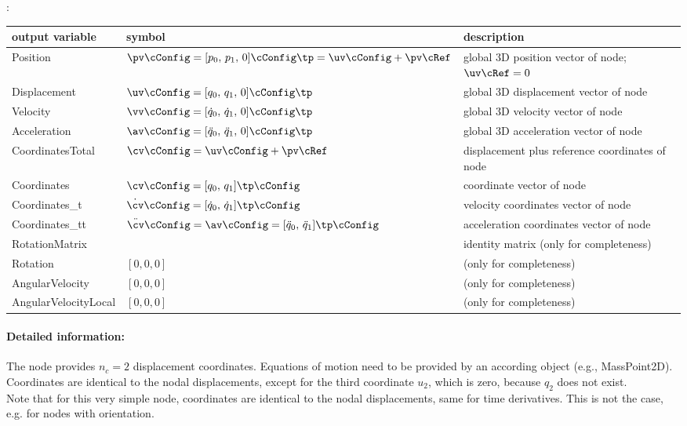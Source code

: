 :
\begin{center}
\footnotesize
\begin{longtable}{| p{5cm} | p{5cm} | p{6cm} |} 
\hline
\bf output variable & \bf symbol & \bf description \\ \hline
Position & $\pv\cConfig = [p_0,\,p_1,\,0]\cConfig\tp= \uv\cConfig + \pv\cRef$ & global 3D position vector of node; $\uv\cRef=0$\\ \hline
Displacement & $\uv\cConfig = [q_0,\,q_1,\,0]\cConfig\tp$ & global 3D displacement vector of node\\ \hline
Velocity & $\vv\cConfig = [\dot q_0,\,\dot q_1,\,0]\cConfig\tp$ & global 3D velocity vector of node\\ \hline
Acceleration & $\av\cConfig = [\ddot q_0,\,\ddot q_1,\,0]\cConfig\tp$ & global 3D acceleration vector of node\\ \hline
CoordinatesTotal & $\cv\cConfig = \uv\cConfig + \pv\cRef$ &  displacement plus reference coordinates of node\\ \hline
Coordinates & $\cv\cConfig = [q_0,\,q_1]\tp\cConfig$ &  coordinate vector of node\\ \hline
Coordinates\_t & $\dot\cv\cConfig = [\dot q_0,\,\dot q_1]\tp\cConfig$ &  velocity coordinates vector of node\\ \hline
Coordinates\_tt & $\ddot\cv\cConfig = \av\cConfig = [\ddot q_0,\,\ddot q_1]\tp\cConfig$ &  acceleration coordinates vector of node\\ \hline
RotationMatrix &  & identity matrix (only for completeness)\\ \hline
Rotation & $[0,0,0]$ &  (only for completeness)\\ \hline
AngularVelocity & $[0,0,0]$ &  (only for completeness)\\ \hline
AngularVelocityLocal & $[0,0,0]$ &  (only for completeness)\\ \hline
\end{longtable}
\end{center}
 \noindent
    \paragraph{Detailed information:}
    The node provides $n_c=2$ displacement coordinates. Equations of motion need to be provided by an according object (e.g., MassPoint2D).
    Coordinates are identical to the nodal displacements, except for the third coordinate $u_2$, which is zero, because $q_2$ does not exist. \vspace{6pt}\\
    Note that for this very simple node, coordinates are identical to the nodal displacements, same for time derivatives. This is not the case, e.g. for nodes with orientation. \vspace{6pt}\\
    
